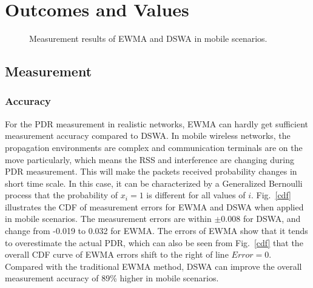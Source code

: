 \documentclass[draftclsnofoot,journal,onecolumn,11pt]{IEEEtran}
\begin{document}
\section{Outcomes and Values}
\begin{figure}[!t]
\centerline{
}
\caption{Measurement results of EWMA and DSWA in mobile scenarios.}
\label{DSWA_error}
\end{figure}

\subsection{Measurement}
\subsubsection{Accuracy}
For the PDR measurement in realistic networks, EWMA can hardly get sufficient measurement accuracy compared to DSWA. In mobile wireless networks, the propagation environments are complex and communication terminals are on the move particularly, which means the RSS and interference are changing during PDR measurement. This will make the packets received probability changes in short time scale. In this case, it can be characterized by a Generalized Bernoulli process that the probability of $x_i=1$ is different for all values of $i$. Fig.~\ref{cdf} illustrates the CDF of measurement errors for EWMA and DSWA when applied in mobile scenarios. The measurement errors are within $\pm$0.008 for DSWA, and change from -0.019 to 0.032 for EWMA. The errors of EWMA show that it tends to overestimate the actual PDR, which can also be seen from Fig.~\ref{cdf} that the overall CDF curve of EWMA errors shift to the right of line $Error=0$. Compared with the traditional EWMA method, DSWA can improve the overall measurement accuracy of 89\% higher in mobile scenarios.
\end{document}
